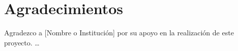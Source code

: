 \section{Agradecimientos}
Agradezco a [Nombre o Institución] por su apoyo en la realización de este proyecto. \dots

\newpage